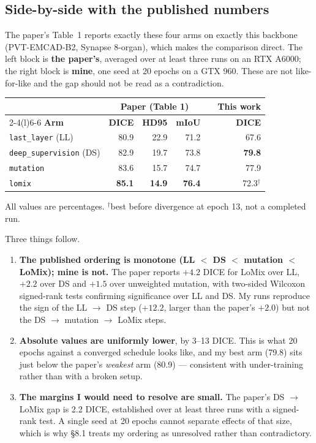 \documentclass[11pt,a4paper]{article}
\newcommand{\code}[1]{\texttt{\small #1}}
\begin{document}
\subsection{Side-by-side with the published numbers}

The paper's Table~1 reports exactly these four arms on exactly this backbone
(PVT-EMCAD-B2, Synapse 8-organ), which makes the comparison direct. The left
block is \textbf{the paper's}, averaged over at least three runs on an RTX
A6000; the right block is \textbf{mine}, one seed at 20 epochs on a GTX 960.
These are not like-for-like and the gap should not be read as a contradiction.

\begin{center}
\begin{tabular}{@{}lrrrcr@{}}
\toprule
& \multicolumn{3}{c}{\textbf{Paper (Table 1)}} & & \textbf{This work} \\
\cmidrule(lr){2-4}\cmidrule(l){6-6}
\textbf{Arm} & \textbf{DICE} & \textbf{HD95} & \textbf{mIoU} & &
\textbf{DICE} \\
\midrule
\code{last\_layer} (LL) & 80.9 & 22.9 & 71.2 & & 67.6 \\
\code{deep\_supervision} (DS) & 82.9 & 19.7 & 73.8 & & \textbf{79.8} \\
\code{mutation} & 83.6 & 15.7 & 74.7 & & 77.9 \\
\code{lomix} & \textbf{85.1} & \textbf{14.9} & \textbf{76.4} & & 72.3$^\dagger$ \\
\bottomrule
\end{tabular}
\end{center}
{\small All values are percentages. $^\dagger$best before divergence at epoch
13, not a completed run.}

Three things follow.

\begin{enumerate}
\item \textbf{The published ordering is monotone
(LL $<$ DS $<$ mutation $<$ LoMix); mine is not.} The paper reports $+4.2$ DICE
for LoMix over LL, $+2.2$ over DS and $+1.5$ over unweighted mutation, with
two-sided Wilcoxon signed-rank tests confirming significance over LL and DS.
My runs reproduce the sign of the LL $\rightarrow$ DS step ($+12.2$, larger than
the paper's $+2.0$) but not the DS $\rightarrow$ mutation $\rightarrow$ LoMix
steps.
\item \textbf{Absolute values are uniformly lower}, by 3--13 DICE. This is what
20 epochs against a converged schedule looks like, and my best arm (79.8) sits
just below the paper's \emph{weakest} arm (80.9) --- consistent with
under-training rather than with a broken setup.
\item \textbf{The margins I would need to resolve are small.} The paper's
DS $\rightarrow$ LoMix gap is 2.2 DICE, established over at least three runs
with a signed-rank test. A single seed at 20 epochs cannot separate effects of
that size, which is why \S8.1 treats my ordering as unresolved rather than
contradictory.
\end{enumerate}
\end{document}
